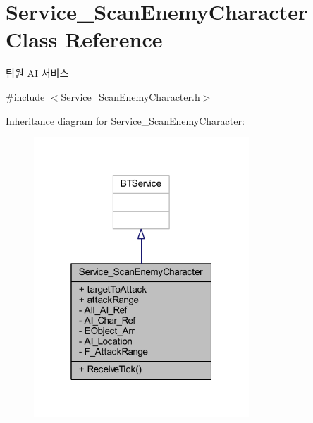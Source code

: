\hypertarget{class_service___scan_enemy_character}{}\section{Service\+\_\+\+Scan\+Enemy\+Character Class Reference}
\label{class_service___scan_enemy_character}


팀원 AI 서비스  




{\ttfamily \#include $<$Service\+\_\+\+Scan\+Enemy\+Character.\+h$>$}



Inheritance diagram for Service\+\_\+\+Scan\+Enemy\+Character\+:
\nopagebreak
\begin{figure}[H]
\begin{center}
\leavevmode
\includegraphics[width=229pt]{class_service___scan_enemy_character__inherit__graph}
\end{center}
\end{figure}


